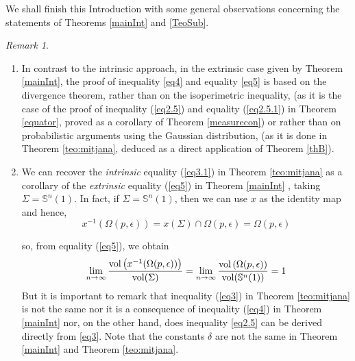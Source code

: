\documentclass{amsart}
\theoremstyle{definition}
\theoremstyle{remark}
\newtheorem{remark}[theorem]{Remark}
\begin{document}
We shall finish this Introduction with some general observations concerning the statements of Theorems \ref{mainInt} and \ref{TeoSub}.
\bigskip


\begin{remark}\label{remarkone}\



\begin{enumerate}
\item In contrast to the intrinsic approach, in the extrinsic case given by Theorem \ref{mainInt}, the proof of inequality \eqref{eq4} and equality \eqref{eq5} is based on the divergence theorem, rather than on the isoperimetric inequality, (as it is the case of the proof of inequality (\ref{eq2.5}) and equality (\ref{eq2.5.1}) in Theorem \ref{equator}, proved as a corollary of Theorem \ref{measurecon}) or rather than on probabilistic arguments using the Gaussian distribution, (as it is done in Theorem \ref{teo:mitjana}, deduced as a direct application of Theorem \ref{thB}).
\medskip

\item We can recover the {\em intrinsic} equality  (\ref{eq3.1}) in Theorem \ref{teo:mitjana} as a corollary of the {\em extrinsic} equality (\ref{eq5}) in Theorem \ref{mainInt} , taking $\Sigma=\mathbb{S}^n(1)$. In fact, if $\Sigma=\mathbb{S}^n(1)$, then we can use $x$ as the identity map  and hence, 
$$x^{-1}(\Omega(p,\epsilon))=x(\Sigma) \cap \Omega(p,\epsilon) =\Omega(p,\epsilon)$$

\noindent so, from equality (\ref{eq5}), we obtain
$$
\lim_{n\to\infty}\frac{{\rm vol}\left(x^{-1}(\Omega(p,\epsilon))\right)}{{\rm vol}(\Sigma)}=\lim_{n\to\infty}\frac{{\rm vol}\left(\Omega(p,\epsilon)\right)}{{\rm vol}(\mathbb{S}^n(1))}=1
$$
But it is important to remark that inequality (\ref{eq3}) in Theorem \ref{teo:mitjana} is not the same nor it is  a consequence of inequality (\ref{eq4}) in Theorem \ref{mainInt} nor, on the other hand, does inequality \eqref{eq2.5} can  be derived directly from \eqref{eq3}. Note that the constants $\delta$ are not the same in Theorem \ref{mainInt} and Theorem \ref{teo:mitjana}.
\medskip



\end{enumerate}
\end{remark}
\end{document}
